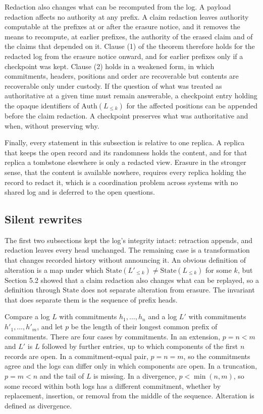 \documentclass[11pt]{article}
\theoremstyle{plain}
\theoremstyle{definition}
\theoremstyle{remark}
\begin{document}
Redaction also changes what can be recomputed from the log. A payload redaction affects no authority at any prefix. A claim redaction leaves authority computable at the prefixes at or after the erasure notice, and it removes the means to recompute, at earlier prefixes, the authority of the erased claim and of the claims that depended on it. Clause (1) of the theorem therefore holds for the redacted log from the erasure notice onward, and for earlier prefixes only if a checkpoint was kept. Clause (2) holds in a weakened form, in which commitments, headers, positions and order are recoverable but contents are recoverable only under custody. If the question of what was treated as authoritative at a given time must remain answerable, a checkpoint entry holding the opaque identifiers of $\mathrm{Auth}(L_{\le k})$ for the affected positions can be appended before the claim redaction. A checkpoint preserves what was authoritative and when, without preserving why.

Finally, every statement in this subsection is relative to one replica. A replica that keeps the open record and its randomness holds the content, and for that replica a tombstone elsewhere is only a redacted view. Erasure in the stronger sense, that the content is available nowhere, requires every replica holding the record to redact it, which is a coordination problem across systems with no shared log and is deferred to the open questions.

\subsection{Silent rewrites}
The first two subsections kept the log's integrity intact: retraction appends, and redaction leaves every head unchanged. The remaining case is a transformation that changes recorded history without announcing it. An obvious definition of alteration is a map under which $\mathrm{State}(L'_{\le k})\neq\mathrm{State}(L_{\le k})$ for some $k$, but Section 5.2 showed that a claim redaction also changes what can be replayed, so a definition through $\mathrm{State}$ does not separate alteration from erasure. The invariant that does separate them is the sequence of prefix heads.

Compare a log $L$ with commitments $h_1,\dots,h_n$ and a log $L'$ with commitments $h'_1,\dots,h'_m$, and let $p$ be the length of their longest common prefix of commitments. There are four cases by commitments. In an extension, $p=n<m$ and $L'$ is $L$ followed by further entries, up to which components of the first $n$ records are open. In a commitment-equal pair, $p=n=m$, so the commitments agree and the logs can differ only in which components are open. In a truncation, $p=m<n$ and the tail of $L$ is missing. In a divergence, $p<\min(n,m)$, so some record within both logs has a different commitment, whether by replacement, insertion, or removal from the middle of the sequence. Alteration is defined as divergence.
\end{document}
